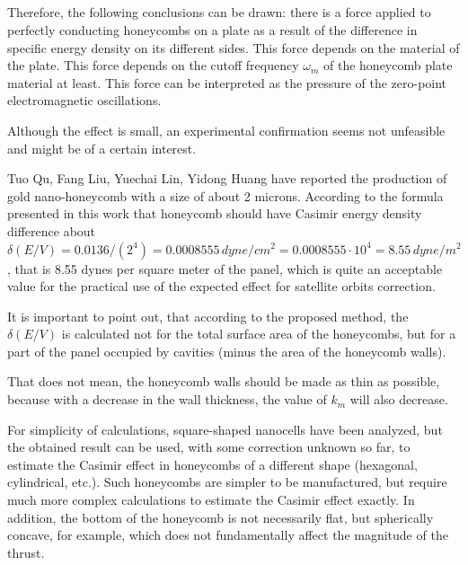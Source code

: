\documentclass[twoside, 10pt]{article}
\def\myvspacebeforesubsection{-2.0mm}
\def\myvspaceaftersubsection{-2.5mm}
\begin{document}
\begin{multicols}{2}

\vspace{\myvspacebeforesubsection}
    \subsection*{} \label{conclusions}
\vspace{\myvspaceaftersubsection}


    Therefore, the following conclusions can be drawn: there is a force applied
to perfectly conducting honeycombs on a plate as a result of the
difference in specific energy density on its different sides. This force
depends on the material of the plate. This force depends
on the cutoff frequency \(\omega_m\) of the honeycomb plate material at least.
This force can be interpreted as the pressure of the zero-point
electromagnetic oscillations.

    Although the effect is small, an experimental confirmation seems not
unfeasible and might be of a certain interest.

    Tuo Qu, Fang Liu, Yuechai Lin, Yidong Huang \cite{Tuo2019} have reported
the production of gold nano-honeycomb with a size of about 2
microns. According to the formula presented in this work that honeycomb should
have Casimir energy density difference about
\(\delta\left(E/V\right) = 0.0136/({2^4}) = 0.0008555\,dyne/cm^2 = 0.0008555 \cdot 10^4 = 8.55\,dyne/m^2\),
that is 8.55 dynes per square meter of the panel, which is quite
an acceptable value for the practical use of the expected effect for
satellite orbits correction.

    It is important to point out, that according to the proposed method,
the \(\delta\left(E/V\right)\) is
calculated not for the total surface area of the honeycombs, but for a
part of the panel occupied by cavities (minus the area of the
honeycomb walls).

    That does not mean, the honeycomb walls should be made as thin
as possible, because with a decrease in the wall thickness, the value of
\(k_m\) will also decrease.

    For simplicity of calculations, square-shaped nanocells have been analyzed,
but the obtained result can be used, with some correction unknown so far,
to estimate the Casimir effect in honeycombs of a different shape
(hexagonal, cylindrical, etc.). Such honeycombs are simpler to be manufactured,
but require much more complex calculations to estimate the Casimir effect exactly.
In addition, the bottom of the honeycomb is not necessarily flat, but
spherically concave, for example, which does not fundamentally affect
the magnitude of the thrust.


\end{multicols}
\end{document}
